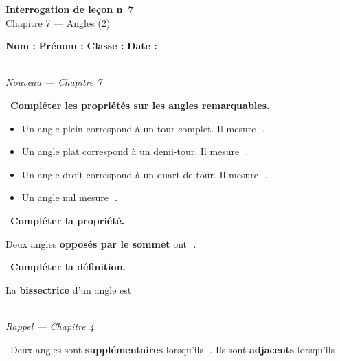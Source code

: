 \documentclass[a4paper,11pt]{article}
\newcommand{\bl}[1][4cm]{\,\makebox[#1]{\dotfill}\,}
\newcommand{\coeur}{\textcolor{Couleur8}{\faHeart}\ }
\newcommand{\coeurrappel}{\textcolor{Couleur6}{\faHeart}\ }
\begin{document}
\begin{mdframed}[linecolor=Couleur1,linewidth=2pt,topline=true,bottomline=true,leftline=false,rightline=false,innertopmargin=8pt,innerbottommargin=8pt,backgroundcolor=Couleur1!5]
\begin{center}
{\Large\bfseries\textcolor{Couleur1}{Interrogation de le\c{c}on n\degre~7}}\\[4pt]
{\large\textcolor{Couleur8}{Chapitre 7 --- Angles (2)}}
\end{center}
\end{mdframed}
\vspace{0.4cm}
\noindent\textbf{Nom :} \dotfill\quad\textbf{Pr\'enom :} \dotfill\quad\textbf{Classe :} \dotfill\quad\textbf{Date :} \dotfill
\vspace{0.5cm}

\vspace{0.3cm}
\noindent{\textcolor{Couleur8}{\rule{\textwidth}{0.5pt}}}\\
{\small\textit{\textcolor{Couleur8}{Nouveau --- Chapitre 7}}}
\vspace{0.1cm}

\noindent \coeur \textbf{Compl\'eter les propri\'et\'es sur les angles remarquables.}
\begin{mdframed}[linecolor=Couleur1,linewidth=4pt,topline=false,bottomline=false,rightline=false,backgroundcolor=Couleur1!5,innerleftmargin=8pt,innertopmargin=6pt,innerbottommargin=6pt]
\begin{itemize}[label=\textcolor{Couleur1}{$\bullet$},nosep,itemsep=4pt]
\item Un angle plein correspond \`a un tour complet. Il mesure \bl[2cm].
\item Un angle plat correspond \`a un demi-tour. Il mesure \bl[2cm].
\item Un angle droit correspond \`a un quart de tour. Il mesure \bl[2cm].
\item Un angle nul mesure \bl[2cm].
\end{itemize}
\end{mdframed}

\noindent \coeur \textbf{Compl\'eter la propri\'et\'e.}
\begin{mdframed}[linecolor=Couleur1,linewidth=4pt,topline=false,bottomline=false,rightline=false,backgroundcolor=Couleur1!5,innerleftmargin=8pt,innertopmargin=6pt,innerbottommargin=6pt]
Deux angles \textbf{oppos\'es par le sommet} ont \bl[5cm].
\end{mdframed}

\noindent \coeur \textbf{Compl\'eter la d\'efinition.}
\begin{mdframed}[linecolor=Couleur6,linewidth=4pt,topline=false,bottomline=false,rightline=false,backgroundcolor=Couleur6!10,innerleftmargin=8pt,innertopmargin=6pt,innerbottommargin=6pt]
La \textbf{bissectrice} d'un angle est \bl[7cm]\dotfill
\end{mdframed}

\vspace{0.3cm}
\noindent{\textcolor{Couleur8}{\rule{\textwidth}{0.5pt}}}\\
{\small\textit{\textcolor{Couleur8}{Rappel --- Chapitre 4}}}
\vspace{0.1cm}

\noindent \coeurrappel Deux angles sont \textbf{suppl\'ementaires} lorsqu'ils \bl[5cm]. Ils sont \textbf{adjacents} lorsqu'ils \dotfill
\end{document}
